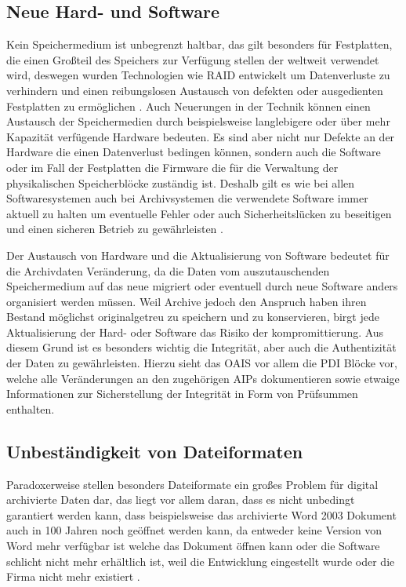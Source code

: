 \documentclass[conference,compsoc,final,a4paper]{IEEEtran}
\begin{document}
\subsection{Neue Hard- und Software}
Kein Speichermedium ist unbegrenzt haltbar, das gilt besonders für Festplatten, die einen Großteil des Speichers zur Verfügung stellen der weltweit verwendet wird, deswegen wurden Technologien wie \ac{RAID} entwickelt um Datenverluste zu verhindern und einen reibungslosen Austausch von defekten oder ausgedienten Festplatten zu ermöglichen \autocite{Lakshmi2008}. Auch Neuerungen in der Technik können einen Austausch der Speichermedien durch beispielsweise langlebigere oder über mehr Kapazität verfügende Hardware bedeuten. Es sind aber nicht nur Defekte an der Hardware die einen Datenverlust bedingen können, sondern auch die Software oder im Fall der Festplatten die Firmware die für die Verwaltung der physikalischen Speicherblöcke zuständig ist. Deshalb gilt es wie bei allen Softwaresystemen auch bei Archivsystemen die verwendete Software immer aktuell zu halten um eventuelle Fehler oder auch Sicherheitslücken zu beseitigen und einen sicheren Betrieb zu gewährleisten \autocite{Lakshmi2008}.

Der Austausch von Hardware und die Aktualisierung von Software bedeutet für die Archivdaten Veränderung, da die Daten vom auszutauschenden Speichermedium auf das neue migriert oder eventuell durch neue Software anders organisiert werden müssen. Weil Archive jedoch den Anspruch haben ihren Bestand möglichst originalgetreu zu speichern und zu konservieren, birgt jede Aktualisierung der Hard- oder Software das Risiko der kompromittierung. Aus diesem Grund ist es besonders wichtig die Integrität, aber auch die Authentizität der Daten zu gewährleisten. Hierzu sieht das \ac{OAIS} vor allem die \ac{PDI} Blöcke vor, welche alle Veränderungen an den zugehörigen \ac{AIP}s dokumentieren sowie etwaige Informationen zur Sicherstellung der Integrität in Form von Prüfsummen enthalten.

\subsection{Unbeständigkeit von Dateiformaten}
Paradoxerweise stellen besonders Dateiformate ein großes Problem für digital archivierte Daten dar, das liegt vor allem daran, dass es nicht unbedingt garantiert werden kann, dass beispielsweise das archivierte Word 2003 Dokument auch in 100 Jahren noch geöffnet werden kann, da entweder keine Version von Word mehr verfügbar ist welche das Dokument öffnen kann oder die Software schlicht nicht mehr erhältlich ist, weil die Entwicklung eingestellt wurde oder die Firma nicht mehr existiert \autocite{dpcFormatsStandards}.
\end{document}
